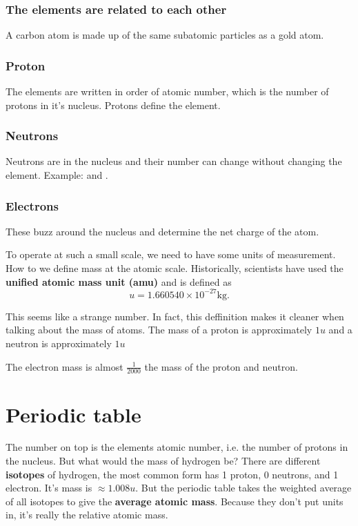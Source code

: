 \subsubsection*{The elements are related to each other}%
\label{sec:The elements are related to eachother}
A carbon atom is made up of the same subatomic particles as a gold atom.


\subsubsection*{Proton}%
\label{sec:Proton}

The elements are written in order of atomic number, which is the number of
protons in it's nucleus. Protons define the element.

\subsubsection*{Neutrons}%
\label{sec:section name{Neutrons}}
Neutrons are in the nucleus and their number can change without changing the
element. Example:  and .
\subsubsection{Electrons}%
\label{ssub:electrons}

These buzz around the nucleus and determine the net charge of the atom.



To operate at such a small scale, we need to have some units of measurement.
How to we define mass at the atomic scale. Historically, scientists have used the
\textbf{unified atomic mass unit (amu)} and is defined as \[
	u = 1.660540 \times 10^{-27} \text{kg}
.\]

This seems like a strange number. In fact, this deffinition makes it cleaner when
talking about the mass of atoms. The mass of a proton is approximately $1u$ and
a neutron is approximately $1u$

The electron mass is almost $\frac{1}{2000}$ the mass of the proton and neutron.
\section{Periodic table}%
\label{sec:periodic_table}

The number on top is the elements atomic number, i.e. the number of protons in the
nucleus. But what would the mass of hydrogen be? There are different \textbf{isotopes}
of hydrogen, the most common form has 1 proton, 0 neutrons, and 1 electron. It's mass
is $\approx 1.008 u$. But the periodic table takes the weighted average of all isotopes
to give the \textbf{average atomic mass}. Because they don't put units in, it's really the
relative atomic mass.

